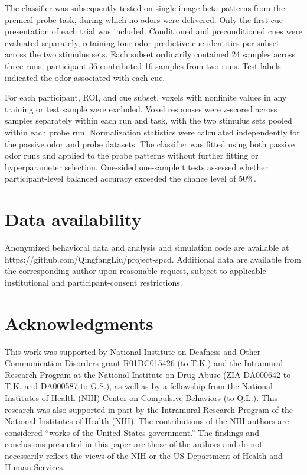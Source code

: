 \documentclass[12pt,letterpaper]{article}
\begin{document}
The classifier was subsequently tested on single-image beta patterns from the premeal probe task, during which no odors were delivered. Only the first cue presentation of each trial was included. Conditioned and preconditioned cues were evaluated separately, retaining four odor-predictive cue identities per subset across the two stimulus sets. Each subset ordinarily contained 24 samples across three runs; participant 36 contributed 16 samples from two runs. Test labels indicated the odor associated with each cue.

For each participant, ROI, and cue subset, voxels with nonfinite values in any training or test sample were excluded. Voxel responses were z-scored across samples separately within each run and task, with the two stimulus sets pooled within each probe run. Normalization statistics were calculated independently for the passive odor and probe datasets. The classifier was fitted using both passive odor runs and applied to the probe patterns without further fitting or hyperparameter selection. One-sided one-sample t tests assessed whether participant-level balanced accuracy exceeded the chance level of 50\%. 









 

\section*{Data availability}
Anonymized behavioral data and analysis and simulation code are available at https://github.com/QingfangLiu/project-spcd. Additional data are available from the corresponding author upon reasonable request, subject to applicable institutional and participant-consent restrictions.




\section*{Acknowledgments}
This work was supported by National Institute on Deafness and Other Communication Disorders grant R01DC015426 (to T.K.) and the Intramural Research Program at the National Institute on Drug Abuse (ZIA DA000642 to T.K. and DA000587 to G.S.), as well as by a fellowship from the National Institutes of Health (NIH) Center on Compulsive Behaviors (to Q.L.). This research was also supported in part by the Intramural Research Program of the National Institutes of Health (NIH). The contributions of the NIH authors are considered “works of the United States government.” The findings and conclusions presented in this paper are those of the authors and do not necessarily reflect the views of the NIH or the US Department of Health and Human Services.



 







\end{document}
